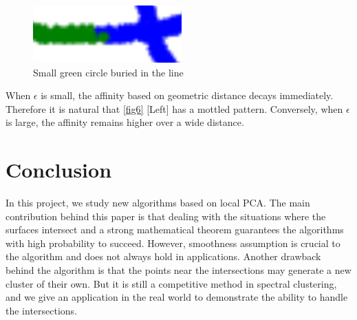 \documentclass[twoside,11pt]{article}
\begin{document}
\begin{figure}[htbp]
\centering
\includegraphics[width=0.22  \textwidth]{boundary.png}
\vspace{-1em}
\caption{Small green circle buried in the line}
\label{fig7}
\end{figure}

When $\epsilon$ is small, the affinity based on geometric distance decays immediately.
Therefore it is natural that \autoref{fig6} [Left] has a mottled pattern.
Conversely, when $\epsilon$ is large, the affinity remains higher over a wide distance.



\section{Conclusion}
In this project, we study new algorithms based on local PCA.
The main contribution behind this paper is that dealing with the situations where the surfaces intersect and a strong mathematical theorem guarantees the algorithms with high probability to succeed.
However, smoothness assumption is crucial to the algorithm and does not always hold in applications.
Another drawback behind the algorithm is that the points near the intersections may generate a new cluster of their own.
But it is still a competitive method in spectral clustering, and we give an application in the real world to demonstrate the ability to handle the intersections.

                




\newpage

\appendix

\vskip 0.2in
% 
% 

\end{document}
